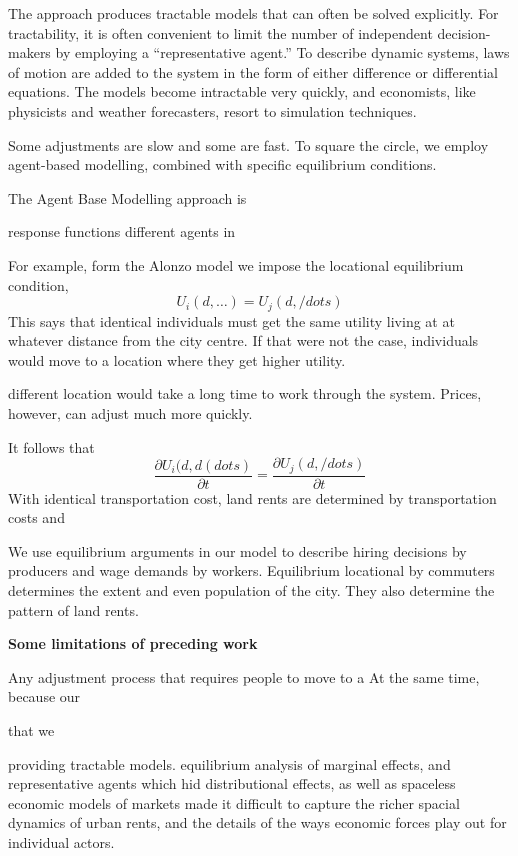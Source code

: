 The approach produces tractable  models that can often be solved explicitly. For tractability, it is often convenient to limit the number of independent decision-makers by employing a ``representative agent.'' To describe dynamic systems, laws of motion are added to the system in the form of either difference or differential equations. The models become intractable very quickly, and economists, like physicists and weather forecasters, resort to simulation techniques.     

Some adjustments are slow and some are fast. To square the circle, we employ  agent-based modelling, combined with specific equilibrium conditions. 

The Agent Base Modelling approach is 

response functions
different agents in 

For example, form the Alonzo model we impose the locational equilibrium condition,
\[U_i(d,\dots)=U_j(d, /dots)\]
This says that identical individuals must get the same utility living at at whatever distance from the city centre. If that were not the case, individuals would move to a location where they get higher utility.

different location would take a long time to work through the system. Prices, however, can adjust much more quickly. 

 It follows that 
\[\frac{\partial U_i(d, d(dots)}{\partial t}=\frac{\partial U_j(d, /dots)}{\partial t}\]
With identical transportation cost, 
land rents are determined by transportation costs  and  

We use  equilibrium arguments in our model to describe hiring decisions by producers and wage demands by workers. Equilibrium locational by commuters determines the extent and even population of the city. They also determine the pattern of land rents. 



\textbf{Some limitations of preceding work}%


Any adjustment process that requires people to move to a 
At the same time, because our  

that we 

providing tractable models.  equilibrium analysis of marginal effects, and representative agents which hid distributional effects, as well as spaceless economic models of markets made it difficult to capture the richer spacial dynamics of urban rents, and the details of the ways economic forces play out for individual actors.

